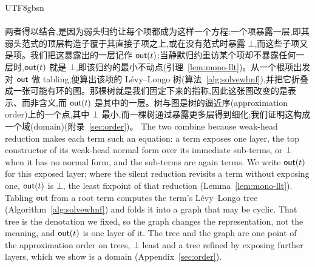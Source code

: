 \begin{CJK*}{UTF8}{gbsn}
  \paragraph{}
  \ifTablambdaChinese
  两者得以结合,是因为弱头归约让每个项都成为这样一个方程:一个项暴露一层,即其弱头范式的顶层构造子覆于其直接子项之上,或在没有范式时暴露 $\bot$,而这些子项又是项。我们把这暴露出的一层记作 $\mathsf{out}(t)$;当静默归约重访某个项却不暴露任何一层时,$\mathsf{out}(t)$ 就是 $\bot$,即该归约的最小不动点(引理~\ref{lem:mono-llt})。从一个根项出发对 $\mathsf{out}$ 做 tabling,便算出该项的 Lévy--Longo 树(算法~\ref{alg:solvewhnf}),并把它折叠成一张可能有环的图。那棵树就是我们固定下来的指称,因此这张图改变的是表示、而非含义,而 $\mathsf{out}(t)$ 是其中的一层。树与图是树的逼近序(approximation order)上的一个点,其中 $\bot$ 最小,而一棵树通过暴露更多层得到细化;我们证明这构成一个域(domain)(附录~\ref{sec:order})。
  \else
  The two combine because weak-head reduction makes each term such an equation: a term exposes one layer, the top constructor of its weak-head normal form over its immediate sub-terms, or $\bot$ when it has no normal form, and the sub-terms are again terms. We write $\mathsf{out}(t)$ for this exposed layer; where the silent reduction revisits a term without exposing one, $\mathsf{out}(t)$ is $\bot$, the least fixpoint of that reduction (Lemma~\ref{lem:mono-llt}). Tabling $\mathsf{out}$ from a root term computes the term's L\'evy--Longo tree (Algorithm~\ref{alg:solvewhnf}) and folds it into a graph that may be cyclic. That tree is the denotation we fixed, so the graph changes the representation, not the meaning, and $\mathsf{out}(t)$ is one layer of it. The tree and the graph are one point of the approximation order on trees, $\bot$ least and a tree refined by exposing further layers, which we show is a domain (Appendix~\ref{sec:order}).
  \fi


\end{CJK*}
